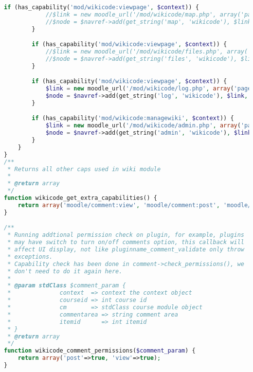 \begin{lstlisting}[language=PHP]
        if (has_capability('mod/wikicode:viewpage', $context)) {
            //$link = new moodle_url('/mod/wikicode/map.php', array('pageid' => $pageid));
            //$node = $navref->add(get_string('map', 'wikicode'), $link, navigation_node::TYPE_SETTING);
        }

        if (has_capability('mod/wikicode:viewpage', $context)) {
            //$link = new moodle_url('/mod/wikicode/files.php', array('pageid' => $pageid));
            //$node = $navref->add(get_string('files', 'wikicode'), $link, navigation_node::TYPE_SETTING);
        }

		if (has_capability('mod/wikicode:viewpage', $context)) {
            $link = new moodle_url('/mod/wikicode/log.php', array('pageid' => $pageid));
            $node = $navref->add(get_string('log', 'wikicode'), $link, navigation_node::TYPE_SETTING);
        }

        if (has_capability('mod/wikicode:managewiki', $context)) {
            $link = new moodle_url('/mod/wikicode/admin.php', array('pageid' => $pageid));
            $node = $navref->add(get_string('admin', 'wikicode'), $link, navigation_node::TYPE_SETTING);
        }
    }
}
/**
 * Returns all other caps used in wiki module
 *
 * @return array
 */
function wikicode_get_extra_capabilities() {
    return array('moodle/comment:view', 'moodle/comment:post', 'moodle/comment:delete');
}

/**
 * Running addtional permission check on plugin, for example, plugins
 * may have switch to turn on/off comments option, this callback will
 * affect UI display, not like pluginname_comment_validate only throw
 * exceptions.
 * Capability check has been done in comment->check_permissions(), we
 * don't need to do it again here.
 *
 * @param stdClass $comment_param {
 *              context  => context the context object
 *              courseid => int course id
 *              cm       => stdClass course module object
 *              commentarea => string comment area
 *              itemid      => int itemid
 * }
 * @return array
 */
function wikicode_comment_permissions($comment_param) {
    return array('post'=>true, 'view'=>true);
}


\end{lstlisting}
